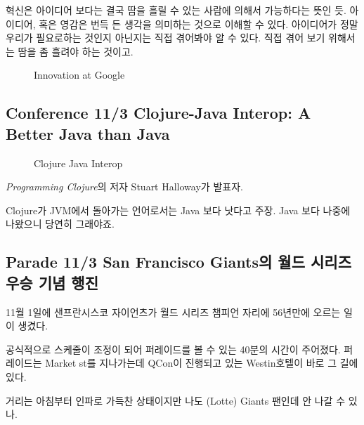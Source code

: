 \documentclass[a4paper]{article}
\begin{document}
혁신은 아이디어 보다는 결국 땀을 흘릴 수 있는 사람에 의해서 가능하다는 뜻인 듯.
아이디어, 혹은 영감은 번득 든 생각을 의미하는 것으로 이해할 수 있다. 
아이디어가 정말 우리가 필요로하는 것인지 아닌지는 직접 겪어봐야 알 수 있다.
직접 겪어 보기 위해서는 땀을 좀 흘려야 하는 것이고.

\begin{figure}[t]
    \begin{Frame}
        \begin{center}
        \end{center}
    \end{Frame}
    \caption{Innovation at Google}
    \label{pretotyping}
\end{figure}

\subsection{Conference 11/3 Clojure-Java Interop: A Better Java than Java}

\begin{figure}[t]
    \begin{Frame}
        \begin{center}
        \end{center}
    \end{Frame}
    \caption{Clojure Java Interop}
    \label{clojure java}
\end{figure}

\textit{Programming Clojure}의 저자 Stuart Halloway가 발표자.
 
Clojure가 JVM에서 돌아가는 언어로서는 Java 보다 낫다고 주장. Java 보다
나중에 나왔으니 당연히 그래야죠.
 
\subsection{Parade 11/3 San Francisco Giants의 월드 시리즈 우승 기념 행진}
 
11월 1일에 샌프란시스코 자이언츠가 월드 시리즈 챔피언 자리에
56년만에 오르는 일이 생겼다. 

공식적으로 스케줄이 조정이 되어 퍼레이드를 볼 수 있는 40분의 시간이
주어졌다.  퍼레이드는 Market st를 지나가는데 QCon이 진행되고 있는
Westin호텔이 바로 그 길에 있다.
 
거리는 아침부터 인파로 가득찬 상태이지만 나도 (Lotte) Giants 팬인데 안
나갈 수 있나.
 
\end{document}
